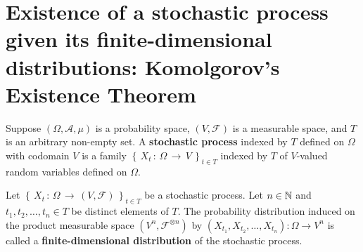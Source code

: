 

\section{Existence of a stochastic process given its finite-dimensional distributions: Komolgorov's Existence Theorem}
\setcounter{theorem}{0}
\setcounter{equation}{0}

\begin{definition}
\mbox{}\vskip 0cm
\noindent
Suppose $\left(\Omega,\mathcal{A},\mu\right)$ is a probability space,
$\left(V,\mathcal{F}\right)$ is a measurable space, and 
$T$ is an arbitrary non-empty set.
A \textbf{stochastic process} indexed by $T$ defined on $\Omega$ with codomain $V$
is a family $\left\{\,X_{t}\,:\,\Omega\,\longrightarrow\,V\,\right\}_{t \in T}$
indexed by $T$ of $V$-valued random variables defined on $\Omega$.
\end{definition}

\begin{definition}
\mbox{}\vskip 0cm
\noindent
Let $\left\{\,X_{t}\,:\,\Omega\,\longrightarrow\,(V,\mathcal{F})\,\right\}_{t \in T}$ be a stochastic process.
Let $n \in \mathbb{N}$ and $t_{1},t_{2},\ldots,t_{n} \in T$ be distinct elements of $T$.
The probability distribution induced on the product measurable space
$\left(V^{n},\mathcal{F}^{\otimes n}\right)$
by $\left(X_{t_{1}},X_{t_{2}},\ldots,X_{t_{n}}\right):\Omega\longrightarrow V^{n}$
is called a \textbf{finite-dimensional distribution} of the stochastic process.
\end{definition}

